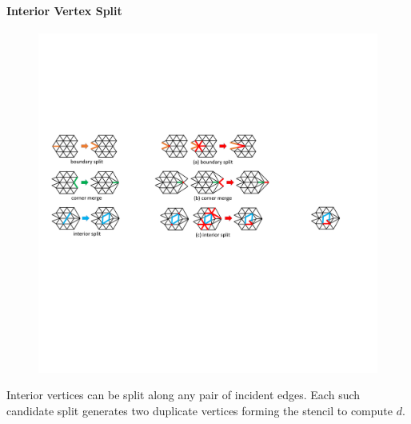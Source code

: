 \paragraph{Interior Vertex Split}
\begin{figure}
  \begin{center}
  \vspace{-4mm}
    \includegraphics[width=1\linewidth]{fig/iSplit.pdf}
  \vspace{-1mm}
  \end{center}
\end{figure}
Interior vertices can be split along 
any pair of incident edges. Each such candidate split generates two duplicate vertices forming the stencil to compute $d$. 

